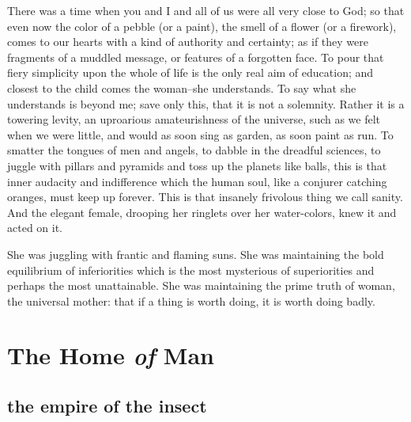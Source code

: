 \documentclass[final,10pt,letterpaper,twocolumn,openany]{book}
\begin{document}
There was a time when you and I and all of us were all very close to
God; so that even now the color of a pebble (or a paint), the smell of a
flower (or a firework), comes to our hearts with a kind of authority and
certainty; as if they were fragments of a muddled message, or features of a
forgotten face. To pour that fiery simplicity upon the whole of life is the
only real aim of education; and closest to the child comes the woman--she
understands. To say what she understands is beyond me; save only this,
that it is not a solemnity. Rather it is a towering levity, an uproarious
amateurishness of the universe, such as we felt when we were little, and
would as soon sing as garden, as soon paint as run. To smatter the tongues
of men and angels, to dabble in the dreadful sciences, to juggle with pillars
and pyramids and toss up the planets like balls, this is that inner audacity
and indifference which the human soul, like a conjurer catching oranges,
must keep up forever. This is that insanely frivolous thing we call sanity.
And the elegant female, drooping her ringlets over her water-colors, knew
it and acted on it. 

She was juggling with frantic and flaming suns. She was
maintaining the bold equilibrium of inferiorities which is the most
mysterious of superiorities and perhaps the most unattainable. She was
maintaining the prime truth of woman, the universal mother: that if a thing
is worth doing, it is worth doing badly.

\chapter{ The Home \textit{of} Man }

\section{the empire of the insect}
\end{document}

